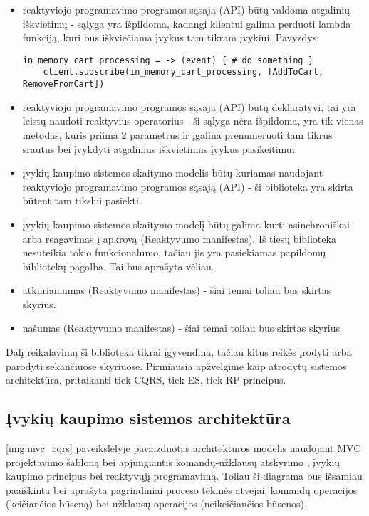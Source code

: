\begin{itemize}
  \item reaktyviojo programavimo programos sąsaja (API) būtų valdoma atgalinių iškvietimų - sąlyga yra išpildoma, kadangi klientui galima perduoti lambda funkciją, kuri bus iškviečiama įvykus tam tikram įvykiui. Pavyzdys:

  \begin{lstlisting}[]
    in_memory_cart_processing = -> (event) { # do something }
    client.subscribe(in_memory_cart_processing, [AddToCart, RemoveFromCart])
  \end{lstlisting}

  \item reaktyviojo programavimo programos sąsaja (API) būtų deklaratyvi, tai yra leistų naudoti reaktyvius operatorius - ši sąlyga nėra išpildoma, yra tik vienas metodas, kuris priima 2 parametrus ir įgalina prenumeruoti tam tikrus srautus bei įvykdyti atgalinius iškvietimus įvykus pasikeitimui.

  \item įvykių kaupimo sistemos skaitymo modelis būtų kuriamas naudojant reaktyviojo programavimo programos sąsają (API) - ši biblioteka yra skirta būtent tam tikslui pasiekti.

  \item įvykių kaupimo sistemos skaitymo modelį būtų galima kurti asinchroniškai arba reagavimas į apkrovą (Reaktyvumo manifestas). Iš tiesų biblioteka nesuteikia tokio funkcionalumo, tačiau jis yra pasiekiamas papildomų bibliotekų pagalba. Tai bus aprašyta vėliau.

  \item atkuriamumas (Reaktyvumo manifestas) - šiai temai toliau bus skirtas skyrius.

  \item našumas (Reaktyvumo manifestas) - šiai temai toliau bus skirtas skyrius
\end{itemize}

Dalį reikalavimų ši biblioteka tikrai įgyvendina, tačiau kitus reikės įrodyti arba parodyti sekančiuose skyriuose. Pirmiausia apžvelgime kaip atrodytų sistemos architektūra, pritaikanti tiek CQRS, tiek ES, tiek RP principus.

\subsection{Įvykių kaupimo sistemos architektūra}

\ref{img:mvc_cqrs} paveikslėlyje pavaizduotas architektūros modelis naudojant MVC projektavimo šabloną bei apjungiantis komandų-užklausų atskyrimo , įvykių kaupimo principus bei reaktyvųjį programavimą. Toliau ši diagrama bus išsamiau paaiškinta bei aprašyta pagrindiniai proceso tėkmės atvejai, komandų operacijos (keičiančios būseną) bei užklausų operacijos (neikeičiančios būsenos).

